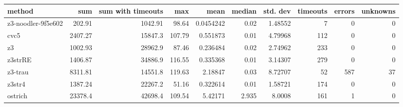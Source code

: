 \begin{tabular}{lrrrrrrrrr}
\hline
 method             &      sum &   sum with timeouts &    max &      mean &   median &   std. dev &   timeouts &   errors &   unknowns \\
\hline
 z3-noodler-9f5e602 &   202.91 &             1042.91 &  98.64 & 0.0454242 &    0.02  &    1.48552 &          7 &        0 &          0 \\
 cvc5               &  2407.27 &            15847.3  & 107.79 & 0.551873  &    0.01  &    4.79968 &        112 &        0 &          0 \\
 z3                 &  1002.93 &            28962.9  &  87.46 & 0.236484  &    0.02  &    2.74962 &        233 &        0 &          0 \\
 z3strRE            &  1406.87 &            34886.9  & 116.55 & 0.335368  &    0.01  &    3.14307 &        279 &        0 &          0 \\
 z3-trau            &  8311.81 &            14551.8  & 119.63 & 2.18847   &    0.03  &    8.72707 &         52 &      587 &         37 \\
 z3str4             &  1387.24 &            22267.2  &  51.16 & 0.322614  &    0.01  &    1.58721 &        174 &        0 &          0 \\
 ostrich            & 23378.4  &            42698.4  & 109.54 & 5.42171   &    2.935 &    8.0008  &        161 &        1 &          0 \\
\hline
\end{tabular}
